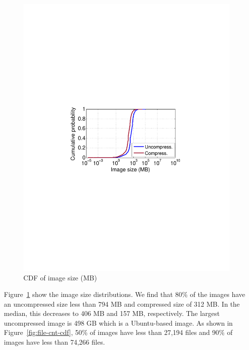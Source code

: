 \begin{figure}[t]
\begin{minipage}{0.33\textwidth}
		\includegraphics[width=1\textwidth]{graphs/image-size-cdf.pdf}
		\caption{CDF of image size (MB)}
		\label{fig:image-size-cdf}
	\end{minipage}%
\end{figure}

Figure~\ref{fig:image-size-cdf} show the image size distributions.
%
%
We find that 80\% of the images have an uncompressed size less than 794 MB and
compressed size of 312 MB.
%
In the median, this decreases to 406 MB and 157 MB, respectively.
%
The largest uncompressed image is 498 GB which is a Ubuntu-based image.
As shown in Figure~\ref{fig:file-cnt-cdf}, 50\% of images have less than 27,194 files 
and 90\% of images have less than 74,266 files.
%

